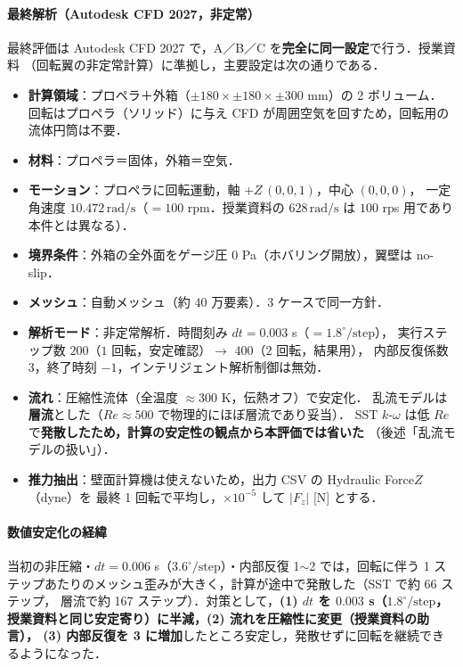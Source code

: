 \documentclass[a4paper,11pt]{jsarticle}
\begin{document}
\paragraph{最終解析（Autodesk CFD 2027，非定常）}
最終評価は Autodesk CFD 2027 で，A／B／C を\textbf{完全に同一設定}で行う．授業資料
（回転翼の非定常計算）に準拠し，主要設定は次の通りである．

\begin{itemize}
  \item \textbf{計算領域}：プロペラ＋外箱（$\pm180\times\pm180\times\pm300$ mm）の 2 ボリューム．
        回転はプロペラ（ソリッド）に与え CFD が周囲空気を回すため，回転用の流体円筒は不要．
  \item \textbf{材料}：プロペラ＝固体，外箱＝空気．
  \item \textbf{モーション}：プロペラに回転運動，軸 $+Z\,(0,0,1)$，中心 $(0,0,0)$，
        一定角速度 $\mathbf{10.472}\,\mathrm{rad/s}$（$=100$ rpm．授業資料の $628\,\mathrm{rad/s}$ は
        $100$ rps 用であり本件とは異なる）．
  \item \textbf{境界条件}：外箱の全外面をゲージ圧 $0$ Pa（ホバリング開放），翼壁は no-slip．
  \item \textbf{メッシュ}：自動メッシュ（約 $40$ 万要素）．3 ケースで同一方針．
  \item \textbf{解析モード}：非定常解析．時間刻み $dt=\boldsymbol{0.003}$ s（$=1.8^\circ/\mathrm{step}$），
        実行ステップ数 $200$（$1$ 回転，安定確認）$\to$ $400$（$2$ 回転，結果用），
        内部反復係数 $3$，終了時刻 $-1$，インテリジェント解析制御は無効．
  \item \textbf{流れ}：圧縮性流体（全温度 $\approx300$ K，伝熱オフ）で安定化．
        乱流モデルは\textbf{層流}とした（$Re\approx500$ で物理的にほぼ層流であり妥当）．
        SST $k\text{-}\omega$ は低 $Re$ で\textbf{発散したため，計算の安定性の観点から本評価では省いた}
        （後述「乱流モデルの扱い」）．
  \item \textbf{推力抽出}：壁面計算機は使えないため，出力 CSV の Hydraulic Force$Z$（dyne）を
        最終 1 回転で平均し，$\times10^{-5}$ して $|F_z|$ [N] とする．
\end{itemize}

\paragraph{数値安定化の経緯}
当初の非圧縮・$dt=0.006$ s（$3.6^\circ/\mathrm{step}$）・内部反復 1$\sim$2 では，回転に伴う
1 ステップあたりのメッシュ歪みが大きく，計算が途中で発散した（SST で約 66 ステップ，
層流で約 167 ステップ）．対策として，\textbf{(1) $dt$ を $0.003$ s（$1.8^\circ/\mathrm{step}$，
授業資料と同じ安定寄り）に半減，(2) 流れを圧縮性に変更（授業資料の助言），
(3) 内部反復を 3 に増加}したところ安定し，発散せずに回転を継続できるようになった．
\end{document}
